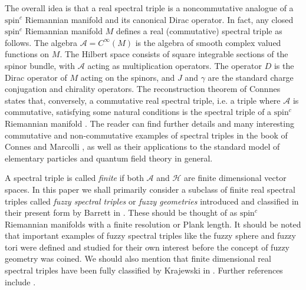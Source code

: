 \documentclass[10pt]{article}
\begin{document}
The overall idea is that a real spectral triple is a noncommutative analogue of a $\text{spin}^c$  Riemannian manifold and its canonical  Dirac operator. In fact, any closed $\text{spin}^c$ Riemannian manifold $M$ defines a real (commutative) spectral triple as follows. The algebra $\mathcal{A}= C^{\infty} (M)$ is the algebra of smooth complex valued functions on $M$. The Hilbert space consists of square integrable sections of the spinor bundle, with $\mathcal{A}$ acting as multiplication operators. The operator  $D$ is the Dirac operator of $M$ acting on the spinors, and $J$ and $\gamma$ are the standard charge conjugation and chirality operators. The reconstruction theorem of Connnes states that, conversely, a commutative real spectral triple, i.e. a triple where $\mathcal{A}$ is commutative, satisfying some natural conditions is the spectral triple of a $\text{spin}^c$ Riemannian manifold \cite{Connes-2013}. The reader can find further details and many interesting commutative and non-commutative examples of spectral triples in the book of Connes and Marcolli \cite{QFTNCG}, as well as their applications to the standard model of elementary particles and quantum field theory in general.  

A spectral triple is called {\it finite} if both $\mathcal{A}$ and $\mathcal{H}$ are finite dimensional vector spaces. In this paper we shall primarily consider a subclass of finite real spectral triples called {\it fuzzy spectral triples} or {\it fuzzy geometries} introduced and classified in their present form by Barrett in \cite{Barrett2015}. These should be thought of as $\text{spin}^c$  Riemannian manifolds with a finite resolution or Plank length. 
It should be noted that important examples of fuzzy spectral triples like the fuzzy sphere \cite{fuzzy sphere, fuzzy sphere spec, fuzzy sphere grosse, Barrett2015, fuzzy sphere Torres} and fuzzy tori \cite{Fuzzy Torus Large N matrices,Fuzzy torus generalized,Fuzzy torus as spectral triple,Fuzzy Torus convergence} were defined and studied for their own interest before the concept of fuzzy geometry was coined.
We should also mention that finite dimensional real spectral triples have been fully classified by Krajewski in \cite{Finite spectral triples}. Further references include \cite{QFTNCG, Marcolli, Barrett2015, VS}. 
\end{document}
